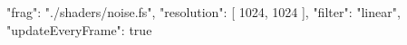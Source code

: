 {
	"frag": "./shaders/noise.fs",
	"resolution": [
		1024,
		1024
	],
	"filter": "linear",
	"updateEveryFrame": true
}
